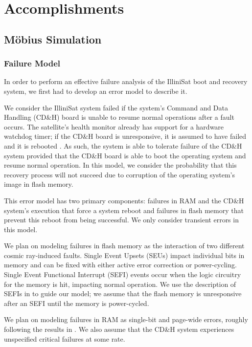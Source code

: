\section{Accomplishments}

\subsection{M\"obius Simulation}

\subsubsection{Failure Model}

In order to perform an effective failure analysis of the IlliniSat boot and recovery system, we first had to develop an error model to describe it.

We consider the IlliniSat system failed if the system's Command and Data Handling (CD\&H) board is unable to resume normal operations after a fault occurs.  The satellite's health monitor already has support for a hardware watchdog timer; if the CD\&H board is unresponsive, it is assumed to have failed and it is rebooted \cite{jagannatha2014command}.  As such, the system is able to tolerate failure of the CD\&H system provided that the CD\&H board is able to boot the operating system and resume normal operation.  In this model, we consider the probability that this recovery process will not succeed due to corruption of the operating system's image in flash memory.

This error model has two primary components: failures in RAM and the CD\&H system's execution that force a system reboot and failures in flash memory that prevent this reboot from being successful.  We only consider transient errors in this model.

We plan on modeling failures in flash memory as the interaction of two different cosmic ray-induced faults.  Single Event Upsets (SEUs) impact individual bits in memory and can be fixed with either active error correction or power-cycling.  Single Event Functional Interrupt (SEFI) events occur when the logic circuitry for the memory is hit, impacting normal operation.  We use the description of SEFIs in \cite{Gerardin2010Present} to guide our model; we assume that the flash memory is unresponsive after an SEFI until the memory is power-cycled.  

We plan on modeling failures in RAM as single-bit and page-wide errors, roughly following the results in \cite{Herrmann2013InSitu}.  We also assume that the CD\&H system experiences unspecified critical failures at some rate.

